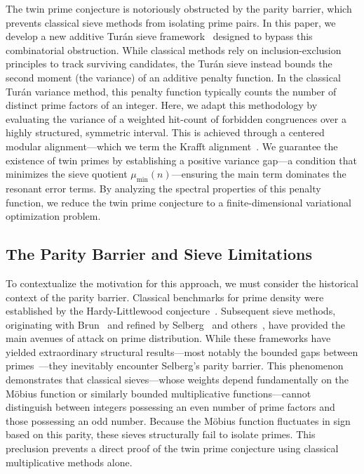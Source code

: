 \documentclass[reqno,notitlepage]{amsart}
\theoremstyle{remark}
\begin{document}
The twin prime conjecture is notoriously obstructed by the parity barrier, which prevents classical
sieve methods from isolating prime pairs. In this paper, we develop a new additive Turán sieve
framework~\cite{Turan1934,CojocaruMurty2005} designed to bypass this combinatorial obstruction. 
While classical methods rely on inclusion-exclusion principles to track surviving candidates, 
the Turán sieve instead bounds the second moment (the variance) of an additive penalty function. 
In the classical Turán variance method, this penalty function typically counts the number of
distinct prime factors of an integer. Here, we adapt this methodology by evaluating the variance of
a weighted hit-count of forbidden congruences over a highly structured, symmetric interval. This is
achieved through a centered modular alignment---which we term the Krafft
alignment~\cite{Krafft1801,Portela2026}. We guarantee the existence of twin primes by establishing
a positive variance gap---a condition that minimizes the sieve quotient $\mu_{\min}(n)$---ensuring
the main term dominates the resonant error terms. By analyzing the spectral properties of this
penalty function, we reduce the twin prime conjecture to a finite-dimensional variational
optimization problem.

\subsection{The Parity Barrier and Sieve Limitations}

To contextualize the motivation for this approach, we must consider the historical context of the parity
barrier. Classical benchmarks for prime density were established by the Hardy-Littlewood
conjecture~\cite{HardyLittlewood1923}. Subsequent sieve methods, originating with
Brun~\cite{Brun1919} and refined by Selberg~\cite{Selberg1947} and
others~\cite{HalberstamRichert1974,MontgomeryVaughan2006}, have provided the main avenues of attack
on prime distribution. While these frameworks have yielded extraordinary structural results---most
notably the bounded gaps between
primes~\cite{GPY2009,Zhang2014,Maynard2015,Polymath8a,Polymath8b}---they inevitably encounter
Selberg's parity barrier. This phenomenon demonstrates that classical sieves---whose weights depend
fundamentally on the Möbius function or similarly bounded multiplicative functions---cannot
distinguish between integers possessing an even number of prime factors and those possessing an odd
number. Because the Möbius function fluctuates in sign based on this parity, these sieves
structurally fail to isolate primes. This preclusion prevents a direct proof of the twin prime
conjecture using classical multiplicative methods alone.
\end{document}
